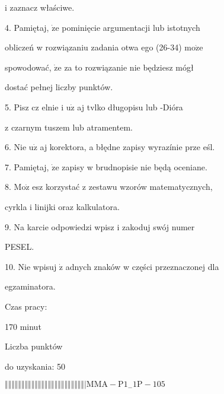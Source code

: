 \documentclass[a4paper,12pt]{article}
\begin{document}
i zaznacz właściwe.

4. Pamiętaj, $\dot{\mathrm{z}}\mathrm{e}$ pominięcie argumentacji lub istotnych

obliczeń w rozwiązaniu zadania otwa ego (26-34) $\mathrm{m}\mathrm{o}\dot{\mathrm{z}}\mathrm{e}$

spowodować, $\dot{\mathrm{z}}\mathrm{e}$ za to rozwiązanie nie będziesz mógł

dostać pełnej liczby punktów.

5. Pisz cz elnie i $\mathrm{u}\dot{\mathrm{z}}$ aj tvlko długopisu lub -Dióra

z czarnym tuszem lub atramentem.

6. Nie $\mathrm{u}\dot{\mathrm{z}}$ aj korektora, a błędne zapisy wyrazínie prze eśl.

7. Pamiętaj, $\dot{\mathrm{z}}\mathrm{e}$ zapisy w brudnopisie nie będą oceniane.

8. $\mathrm{M}\mathrm{o}\dot{\mathrm{z}}$ esz korzystać z zestawu wzorów matematycznych,

cyrkla i linijki oraz kalkulatora.

9. Na karcie odpowiedzi wpisz i zakoduj swój numer

PESEL.

10. Nie wpisuj $\dot{\mathrm{z}}$ adnych znaków w części przeznaczonej dla

egzaminatora.

Czas pracy:

170 minut

Liczba punktów

do uzyskania: 50

$\Vert\Vert\Vert\Vert\Vert\Vert\Vert\Vert\Vert\Vert\Vert\Vert\Vert\Vert\Vert\Vert\Vert\Vert\Vert\Vert\Vert\Vert\Vert\Vert|  \mathrm{M}\mathrm{M}\mathrm{A}-\mathrm{P}1_{-}1\mathrm{P}-105$
\end{document}
